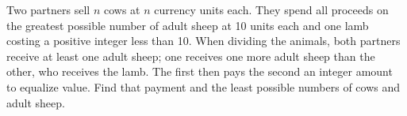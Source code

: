 Two partners sell $n$ cows at $n$ currency units each. They spend all proceeds on the greatest possible number of adult sheep at 10 units each and one lamb costing a positive integer less than 10. When dividing the animals, both partners receive at least one adult sheep; one receives one more adult sheep than the other, who receives the lamb. The first then pays the second an integer amount to equalize value. Find that payment and the least possible numbers of cows and adult sheep.
